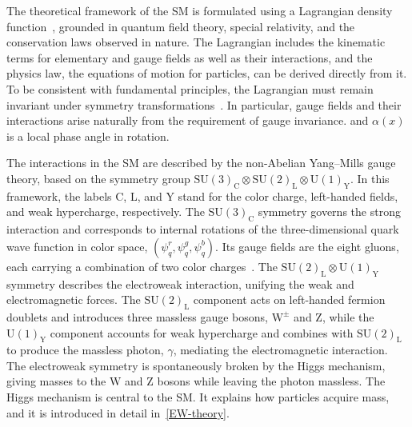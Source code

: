 

The theoretical framework of the SM is formulated using a Lagrangian density function~\cite{PeskinSchroeder1995}, grounded in quantum field theory, special relativity, and the conservation laws observed in nature. The Lagrangian includes the kinematic terms for elementary and gauge fields as well as their interactions, and the physics law, the equations of motion for particles, can be derived directly from it. To be consistent with fundamental principles, the Lagrangian must remain invariant under symmetry transformations~\cite{Noether1918}. In particular, gauge fields and their interactions arise naturally from the requirement of gauge invariance. %
and $\alpha(x)$ is a local phase angle in rotation.

The interactions in the SM are described by the non-Abelian Yang--Mills gauge theory, based on the symmetry group 
\(\text{SU}(3)_{\text{C}} \otimes \text{SU}(2)_{\text{L}} \otimes \text{U}(1)_{\text{Y}}\).  
In this framework, the labels C, L, and Y stand for the color charge, left-handed fields, and weak hypercharge, respectively.
The \(\text{SU}(3)_{\text{C}}\) symmetry governs the strong interaction and corresponds to internal rotations of the three-dimensional quark wave function in color space, \((\psi_q^r, \psi_q^g, \psi_q^b)\). Its gauge fields are the eight gluons, each carrying a combination of two color charges~\cite{Pich2007SM}.  
The \(\text{SU}(2)_{\text{L}} \otimes \text{U}(1)_{\text{Y}}\) symmetry describes the electroweak interaction, unifying the weak and electromagnetic forces. The \(\text{SU}(2)_{\text{L}}\) component acts on left-handed fermion doublets and introduces three massless gauge bosons, \(\text{W}^\pm\) and \(\text{Z}\), while the \(\text{U}(1)_{\text{Y}}\) component accounts for weak hypercharge and combines with \(\text{SU}(2)_{\text{L}}\) to produce the massless photon, \(\gamma\), mediating the electromagnetic interaction.
The electroweak symmetry is spontaneously broken by the Higgs mechanism, giving masses to the $\text{W}$ and $\text{Z}$ bosons while leaving the photon massless.
The Higgs mechanism is central to the SM. It explains how particles acquire mass, and it is introduced in detail in~\ref{EW-theory}.

